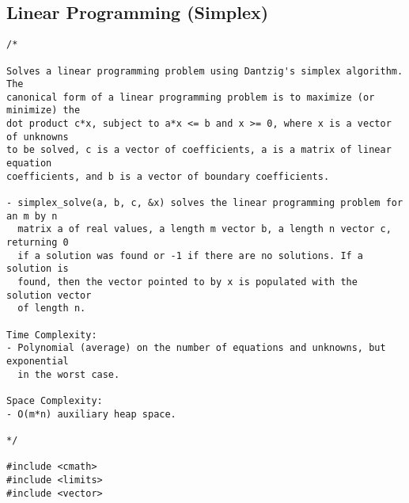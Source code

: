 \subsection{Linear Programming (Simplex)}
\begin{lstlisting}
/*

Solves a linear programming problem using Dantzig's simplex algorithm. The
canonical form of a linear programming problem is to maximize (or minimize) the
dot product c*x, subject to a*x <= b and x >= 0, where x is a vector of unknowns
to be solved, c is a vector of coefficients, a is a matrix of linear equation
coefficients, and b is a vector of boundary coefficients.

- simplex_solve(a, b, c, &x) solves the linear programming problem for an m by n
  matrix a of real values, a length m vector b, a length n vector c, returning 0
  if a solution was found or -1 if there are no solutions. If a solution is
  found, then the vector pointed to by x is populated with the solution vector
  of length n.

Time Complexity:
- Polynomial (average) on the number of equations and unknowns, but exponential
  in the worst case.

Space Complexity:
- O(m*n) auxiliary heap space.

*/

#include <cmath>
#include <limits>
#include <vector>


\end{lstlisting}
